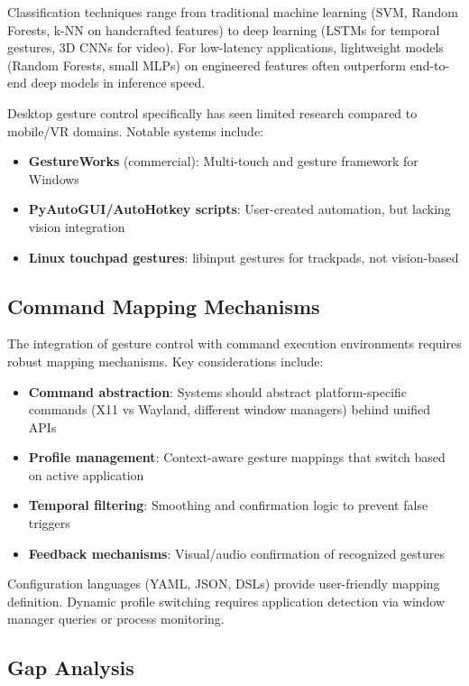 \documentclass[11pt,a4paper]{article}
\begin{document}
Classification techniques range from traditional machine learning (SVM, Random Forests, k-NN on handcrafted features) to deep learning (LSTMs for temporal gestures, 3D CNNs for video). For low-latency applications, lightweight models (Random Forests, small MLPs) on engineered features often outperform end-to-end deep models in inference speed.

Desktop gesture control specifically has seen limited research compared to mobile/VR domains. Notable systems include:
\begin{itemize}
\item \textbf{GestureWorks} (commercial): Multi-touch and gesture framework for Windows
\item \textbf{PyAutoGUI/AutoHotkey scripts}: User-created automation, but lacking vision integration
\item \textbf{Linux touchpad gestures}: libinput gestures for trackpads, not vision-based
\end{itemize}

\subsection{Command Mapping Mechanisms}

The integration of gesture control with command execution environments requires robust mapping mechanisms. Key considerations include:

\begin{itemize}
\item \textbf{Command abstraction}: Systems should abstract platform-specific commands (X11 vs Wayland, different window managers) behind unified APIs
\item \textbf{Profile management}: Context-aware gesture mappings that switch based on active application
\item \textbf{Temporal filtering}: Smoothing and confirmation logic to prevent false triggers
\item \textbf{Feedback mechanisms}: Visual/audio confirmation of recognized gestures
\end{itemize}

Configuration languages (YAML, JSON, DSLs) provide user-friendly mapping definition. Dynamic profile switching requires application detection via window manager queries or process monitoring.

\subsection{Gap Analysis}
\end{document}
